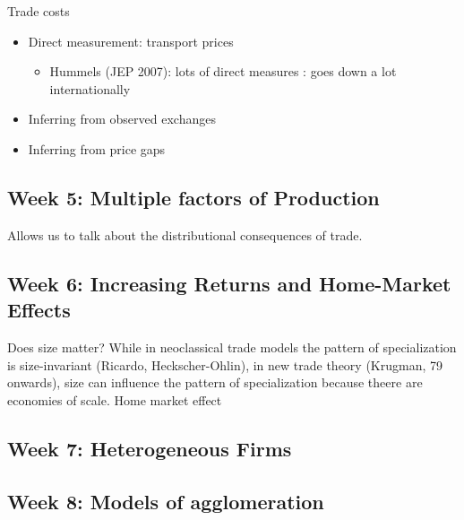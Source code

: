 \documentclass[10pt, final]{article}
\begin{document}
Trade costs
\begin{itemize}
    \item Direct measurement: transport prices
    \begin{itemize}
        \item Hummels (JEP 2007): lots of direct measures : goes down a lot internationally
    \end{itemize}
    \item Inferring from observed exchanges 
    \item Inferring from price gaps
\end{itemize}


\subsection{Week 5: Multiple factors of Production} %
\label{sub:week_5_multiple_factors_of_production}

Allows us to talk about the distributional consequences of trade.


\subsection{Week 6: Increasing Returns and Home-Market Effects} %
\label{sub:week_6_increasing_returns_and_home_market_effects}

Does size matter? While in neoclassical trade models the pattern of specialization is size-invariant (Ricardo, Heckscher-Ohlin), in new trade theory (Krugman, 79 onwards), size can influence the pattern of specialization because theere are economies of scale. Home market effect


\subsection{Week 7: Heterogeneous Firms} %
\label{sub:week_7_heterogeneous_firms}



\subsection{Week 8: Models of agglomeration} %
\label{sub:week_8_models_of_agglomeration}
\end{document}

